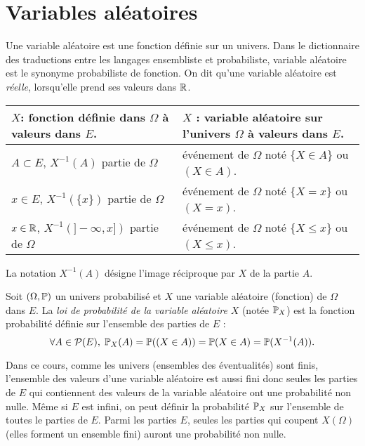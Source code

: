 

\section{Variables aléatoires}
Une variable aléatoire est une fonction définie sur un univers. Dans le dictionnaire des traductions entre les langages ensembliste et probabiliste, \og variable aléatoire\fg ~ est le synonyme probabiliste de \og fonction\fg.\newline 
On dit qu'une variable aléatoire est \emph{réelle}, lorsqu'elle prend ses valeurs dans $\mathbb{R}$.
\begin{center}
\renewcommand{\arraystretch}{1.5}
\begin{tabular}{|l|l|} \hline
$X$: fonction définie dans $\Omega$ à valeurs dans $E$. & $X$ : variable aléatoire sur l'univers $\Omega$ à valeurs dans $E$.\\ \hline
$A\subset E$, $X^{-1}(A)$ partie de $\Omega$   & événement de $\Omega$ noté $\{X \in A\}$ ou $(X\in A)$. \\ \hline
$x\in E$, $X^{-1}(\{x\})$ partie de $\Omega$   & événement de $\Omega$ noté $\{X =x\}$ ou $(X=x)$. \\ \hline
$x\in \mathbb{R}$, $X^{-1}(]-\infty,x])$ partie de $\Omega$   & événement de $\Omega$ noté $\{X \leq x\}$ ou $(X \leq x)$. \\ \hline
\end{tabular} 
\end{center}

La notation $X^{-1}(A)$ désigne l'image réciproque par $X$ de la partie $A$.
\begin{defi}
  Soit $(\Omega, \mathbb{P})$ un univers probabilisé et $X$ une variable aléatoire (fonction) de $\Omega$ dans $E$.\newline
  La \emph{loi de probabilité de la variable aléatoire} $X$ (notée $\mathbb{P}_X$) est la fonction probabilité définie sur l'ensemble des parties de $E$ :
\begin{displaymath}
\forall A \in \mathcal{P}(E), \; \mathbb{P}_X(A) = \mathbb{P}((X\in A)) = \mathbb{P}(X\in A) = \mathbb{P}(X^{-1}(A)).
\end{displaymath}
\end{defi}
\begin{rem}
Dans ce cours, comme les univers (ensembles des éventualités) sont finis, l'ensemble des valeurs d'une variable aléatoire est aussi fini donc seules les parties de $E$ qui contiennent des valeurs de la variable aléatoire ont une probabilité non nulle. Même si $E$ est infini, on peut définir la probabilité $\mathbb{P}_X$ sur l'ensemble de toutes le parties de $E$. Parmi les parties $E$, seules les parties qui coupent $X(\Omega)$ (elles forment un ensemble fini) auront une probabilité non nulle.   
\end{rem}

